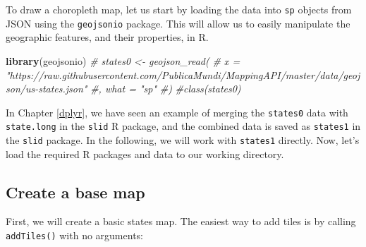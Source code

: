 \documentclass[]{book}
\newenvironment{Shaded}{\begin{snugshade}}{\end{snugshade}}
\newcommand{\KeywordTok}[1]{\textcolor[rgb]{0.13,0.29,0.53}{\textbf{#1}}}
\newcommand{\DataTypeTok}[1]{\textcolor[rgb]{0.13,0.29,0.53}{#1}}
\newcommand{\DecValTok}[1]{\textcolor[rgb]{0.00,0.00,0.81}{#1}}
\newcommand{\FloatTok}[1]{\textcolor[rgb]{0.00,0.00,0.81}{#1}}
\newcommand{\StringTok}[1]{\textcolor[rgb]{0.31,0.60,0.02}{#1}}
\newcommand{\CommentTok}[1]{\textcolor[rgb]{0.56,0.35,0.01}{\textit{#1}}}
\newcommand{\OperatorTok}[1]{\textcolor[rgb]{0.81,0.36,0.00}{\textbf{#1}}}
\newcommand{\NormalTok}[1]{#1}
\begin{document}
To draw a choropleth map, let us start by loading the data into
\texttt{sp} objects from JSON using the \texttt{geojsonio} package. This
will allow us to easily manipulate the geographic features, and their
properties, in R.

\begin{Shaded}
\begin{Highlighting}[]
\KeywordTok{library}\NormalTok{(geojsonio)}
\CommentTok{# states0 <- geojson_read(}
\CommentTok{# x = "https://raw.githubusercontent.com/PublicaMundi/MappingAPI/master/data/geojson/us-states.json"}
\CommentTok{#, what = "sp"}
\CommentTok{#)}
\CommentTok{#class(states0)}
\end{Highlighting}
\end{Shaded}

In Chapter \ref{dplyr}, we have seen an example of merging the
\texttt{states0} data with \texttt{state.long} in the \texttt{slid} R
package, and the combined data is saved as \texttt{states1} in the
\texttt{slid} package. In the following, we will work with
\texttt{states1} directly. Now, let's load the required R packages and
data to our working directory.

\begin{Shaded}
\end{Shaded}

\subsection{Create a base map}\label{create-a-base-map}

First, we will create a basic states map. The easiest way to add tiles
is by calling \texttt{addTiles()} with no arguments:

\begin{Shaded}
\end{Shaded}
\end{document}
